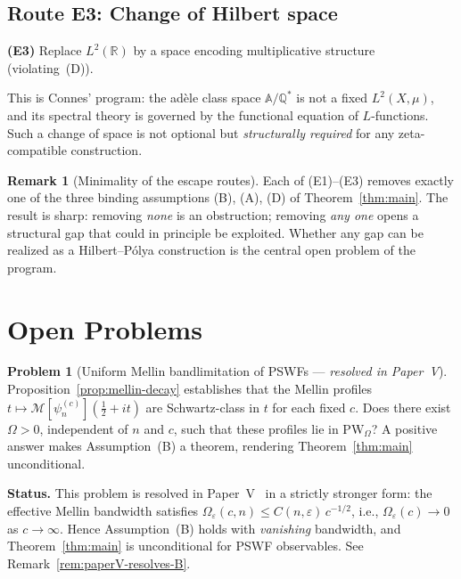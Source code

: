 \documentclass[12pt,a4paper]{amsart}
\theoremstyle{definition}
\newtheorem{remark}[theorem]{Remark}
\newtheorem{problem}[theorem]{Problem}
\newcommand{\PW}{\mathrm{PW}_\Omega}
\begin{document}
\subsection{Route E3: Change of Hilbert space}
\label{ssec:escape-hilbert}

\textbf{(E3)} Replace $L^2(\mathbb{R})$ by a space
encoding multiplicative structure (violating~(D)).

This is Connes' program: the ad\`{e}le class space
$\mathbb{A}/\mathbb{Q}^*$ is not a fixed
$L^2(X,\mu)$, and its spectral theory is governed by
the functional equation of $L$-functions. Such a
change of space is not optional but
\emph{structurally required} for any zeta-compatible
construction.

\begin{remark}[Minimality of the escape routes]
\label{rem:escape-minimal}
Each of (E1)--(E3) removes exactly one of the three
binding assumptions (B), (A), (D) of
Theorem~\ref{thm:main}. The result is sharp:
removing \emph{none} is an obstruction; removing
\emph{any one} opens a structural gap that could in
principle be exploited. Whether any gap can be
realized as a Hilbert--P\'{o}lya construction is the
central open problem of the program.
\end{remark}

\section{Open Problems}
\label{sec:open}

\begin{problem}[Uniform Mellin bandlimitation of
PSWFs --- \emph{resolved in Paper~V}]
\label{prob:mellin-bandlimit}
Proposition~\ref{prop:mellin-decay} establishes that
the Mellin profiles
$t \mapsto \mathcal{M}[\psi_n^{(c)}]
(\tfrac{1}{2}+it)$
are Schwartz-class in $t$ for each fixed $c$.
Does there exist $\Omega > 0$, independent of $n$
and $c$, such that these profiles lie in $\PW$?
A positive answer makes Assumption~(B) a theorem,
rendering Theorem~\ref{thm:main} unconditional.

\medskip
\noindent\textbf{Status.}
This problem is resolved in Paper~V~\cite{PaperV}
in a strictly stronger form: the effective Mellin bandwidth
satisfies $\Omega_\varepsilon(c,n) \le C(n,\varepsilon)\,c^{-1/2}$,
i.e., $\Omega_\varepsilon(c) \to 0$ as $c \to \infty$.
Hence Assumption~(B) holds with \emph{vanishing} bandwidth,
and Theorem~\ref{thm:main} is unconditional for PSWF
observables. See Remark~\ref{rem:paperV-resolves-B}.
\end{problem}
\end{document}
